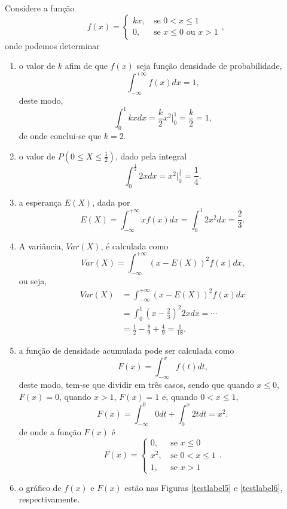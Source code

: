 \begin{pageWidthArea}
	\begin{example}
		\begin{multicols}{2}
			Considere a função
			\[
				f(x)=\begin{cases}
					kx\text{,}&\text{ se } 0 < x \leqslant 1\\
					0\text{,}&\text{ se } x\leqslant 0\text{ ou }x>1
				\end{cases}
				\text{,}
			\]
			onde podemos determinar
			\begin{enumerate}[label={(\alph*)}]
				\item o valor de $k$ afim de que $f(x)$ seja função densidade de probabilidade,
				\[
					\int_{-\infty}^{+\infty} f(x)dx=1
					\text{,}
				\]
				deste modo,
				\[
					\int_{0}^{1} kx dx = \frac{k}{2}x^2\Big|_{0}^{1}
									    = \frac{k}{2}
									    = 1\text{,}
				\]
				de onde conclui-se que $k=2$.
				
				\item o valor de $P(0\leqslant X\leqslant \frac{1}{2})$, dado pela integral
				\[
					\int_{0}^{\frac{1}{2}} 2x dx = x^2\Big|_{0}^{\frac{1}{2}}=\frac{1}{4}
					\text{.}
				\]
				\item a esperança $E(X)$, dada por
				\[
					E(X)=\int_{-\infty}^{+\infty}xf(x)dx
						=\int_{0}^{1}2x^2dx
						=\frac{2}{3}
					\text{.}
				\]
				
				\item A variância, $Var(X)$, é calculada como
				\[
					Var(X)=\int_{-\infty}^{+\infty} (x-E(X))^2 f(x) dx
					\text{,}
				\]
				ou seja,
				\begin{align*}
					Var(X) &=\int_{-\infty}^{+\infty} (x - E(X))^2 f(x) dx\\
						   &=\int_{0}^{1} \left (x-\frac{2}{3} \right )^2 2xdx = \cdots\\
						   &=\frac{1}{2}-\frac{8}{9}+\frac{4}{9} = \frac{1}{18}
						   \text{.}
				\end{align*}
				
				\item a função de densidade acumulada pode ser calculada como
				\[
					F(x)=\int_{-\infty}^{x} f(t)dt
					\text{,}
				\]
				deste modo, tem-se que dividir em três casos, sendo que quando $x\leqslant 0$, $F(x)=0$, quando $x>1$, $F(x)=1$ e, quando $0<x\leqslant 1$,
				\[
					F(x)=\int_{-\infty}^{0} 0dt + \int_{0}^{x}2tdt=x^2\text{.}
				\]
				de onde a função $F(x)$ é
				\[
					F(x)=\begin{cases}
						0\text{,}&\text{ se } x \leqslant 0\\
						x^2\text{,}&\text{ se } 0<x\leqslant 1\\
						1\text{,}&\text{ se } x > 1
					\end{cases}
					\text{.}
				\]
				
				\item o gráfico de $f(x)$ e $F(x)$ estão nas Figuras \ref{testlabel5} e \ref{testlabel6}, respectivamente.
			\end{enumerate}	
		\end{multicols}
	\end{example}
\end{pageWidthArea}

